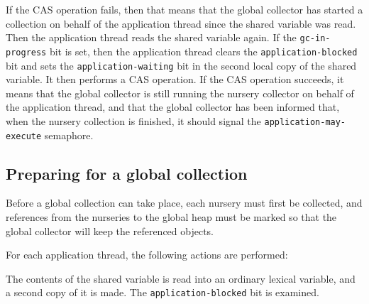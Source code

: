If the CAS operation fails, then that means that the global collector
has started a collection on behalf of the application thread since the
shared variable was read.  Then the application thread
reads the shared variable again.  If the
\texttt{gc-in-progress} bit is set, then the application thread clears
the \texttt{application-blocked} bit and sets the
\texttt{application-waiting} bit in the second local copy of the
shared variable.  It then performs a CAS operation.  If the CAS
operation succeeds, it means that the global collector is still
running the nursery collector on behalf of the application thread, and
that the global collector has been informed that, when the nursery
collection is finished, it should signal the
\texttt{application-may-execute} semaphore.


\subsection{Preparing for a global collection}

Before a global collection can take place, each nursery must first be
collected, and references from the nurseries to the global heap must
be marked so that the global collector will keep the referenced
objects.

For each application thread, the following actions are performed:

The contents of the shared variable is read into an ordinary lexical
variable, and a second copy of it is made.  The
\texttt{application-blocked} bit is examined.


